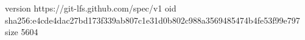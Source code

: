 version https://git-lfs.github.com/spec/v1
oid sha256:e4cde4dac27bd173f339ab807c1e31d0b802c988a3569485474b4fe53f99e797
size 5604
